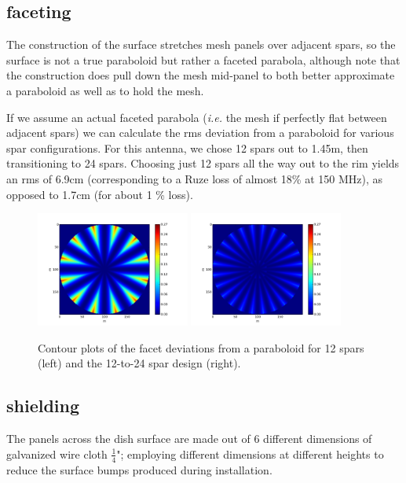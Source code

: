 \documentclass[preprint]{aastex}  %
\begin{document}
\subsection{faceting}
The construction of the surface stretches mesh panels over adjacent spars, so the surface is not a true paraboloid but rather a faceted parabola, although note that the construction does pull down the mesh mid-panel to both better approximate a paraboloid as well as to hold the mesh.

If we assume an actual faceted parabola ({\em i.e.} the mesh if perfectly flat between adjacent spars) we can calculate the rms deviation from a paraboloid for various spar configurations.  For this antenna, we chose 12 spars out to 1.45m, then transitioning to 24 spars.  Choosing just 12 spars all the way out to the rim yields an rms of 6.9cm (corresponding to a Ruze loss of almost 18\% at 150 MHz), as opposed to 1.7cm (for about 1 \% loss).

\begin{figure}[H]
	\begin{center}
	\includegraphics[width =0.45\textwidth]{dish_plots/12spar.png}
	\includegraphics[width = 0.45\textwidth]{dish_plots/special_spar.png}
	\caption{Contour plots of the facet deviations from a paraboloid for 12 spars (left) and the 12-to-24 spar design (right).
\label{Fig:facets} }
	\end{center}
\end{figure}
\clearpage

\subsection{shielding}
The panels across the dish surface are made out of 6 different dimensions of galvanized wire cloth $\frac{1}{4}$"; employing different dimensions at different heights to reduce the surface bumps produced during installation.
\end{document}
